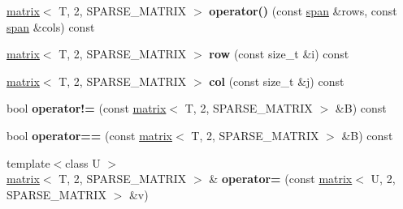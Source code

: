 \begin{DoxyCompactItemize}
\item 
\hypertarget{classkeycpp_1_1matrix_3_01_t_00_012_00_01_s_p_a_r_s_e___m_a_t_r_i_x_01_4_a5cd992aa58c20c8e25921df7f2dbdc53}{\hyperlink{classkeycpp_1_1matrix}{matrix}$<$ T, 2, S\-P\-A\-R\-S\-E\-\_\-\-M\-A\-T\-R\-I\-X $>$ {\bfseries operator()} (const \hyperlink{classkeycpp_1_1span}{span} \&rows, const \hyperlink{classkeycpp_1_1span}{span} \&cols) const }\label{classkeycpp_1_1matrix_3_01_t_00_012_00_01_s_p_a_r_s_e___m_a_t_r_i_x_01_4_a5cd992aa58c20c8e25921df7f2dbdc53}

\item 
\hypertarget{classkeycpp_1_1matrix_3_01_t_00_012_00_01_s_p_a_r_s_e___m_a_t_r_i_x_01_4_a73bb5345dc3cb722ad653bac50979f77}{\hyperlink{classkeycpp_1_1matrix}{matrix}$<$ T, 2, S\-P\-A\-R\-S\-E\-\_\-\-M\-A\-T\-R\-I\-X $>$ {\bfseries row} (const size\-\_\-t \&i) const }\label{classkeycpp_1_1matrix_3_01_t_00_012_00_01_s_p_a_r_s_e___m_a_t_r_i_x_01_4_a73bb5345dc3cb722ad653bac50979f77}

\item 
\hypertarget{classkeycpp_1_1matrix_3_01_t_00_012_00_01_s_p_a_r_s_e___m_a_t_r_i_x_01_4_a41e530bd0c38232974f49562f4c97d6a}{\hyperlink{classkeycpp_1_1matrix}{matrix}$<$ T, 2, S\-P\-A\-R\-S\-E\-\_\-\-M\-A\-T\-R\-I\-X $>$ {\bfseries col} (const size\-\_\-t \&j) const }\label{classkeycpp_1_1matrix_3_01_t_00_012_00_01_s_p_a_r_s_e___m_a_t_r_i_x_01_4_a41e530bd0c38232974f49562f4c97d6a}

\item 
\hypertarget{classkeycpp_1_1matrix_3_01_t_00_012_00_01_s_p_a_r_s_e___m_a_t_r_i_x_01_4_aafd159e412dffd5ebb84620f8a6a7c0a}{bool {\bfseries operator!=} (const \hyperlink{classkeycpp_1_1matrix}{matrix}$<$ T, 2, S\-P\-A\-R\-S\-E\-\_\-\-M\-A\-T\-R\-I\-X $>$ \&B) const }\label{classkeycpp_1_1matrix_3_01_t_00_012_00_01_s_p_a_r_s_e___m_a_t_r_i_x_01_4_aafd159e412dffd5ebb84620f8a6a7c0a}

\item 
\hypertarget{classkeycpp_1_1matrix_3_01_t_00_012_00_01_s_p_a_r_s_e___m_a_t_r_i_x_01_4_a79caa90a213715fc7adde1fe8dbf63d5}{bool {\bfseries operator==} (const \hyperlink{classkeycpp_1_1matrix}{matrix}$<$ T, 2, S\-P\-A\-R\-S\-E\-\_\-\-M\-A\-T\-R\-I\-X $>$ \&B) const }\label{classkeycpp_1_1matrix_3_01_t_00_012_00_01_s_p_a_r_s_e___m_a_t_r_i_x_01_4_a79caa90a213715fc7adde1fe8dbf63d5}

\item 
\hypertarget{classkeycpp_1_1matrix_3_01_t_00_012_00_01_s_p_a_r_s_e___m_a_t_r_i_x_01_4_a0d25ced8f8e02ddd30ca3c1f321162c4}{{\footnotesize template$<$class U $>$ }\\\hyperlink{classkeycpp_1_1matrix}{matrix}$<$ T, 2, S\-P\-A\-R\-S\-E\-\_\-\-M\-A\-T\-R\-I\-X $>$ \& {\bfseries operator=} (const \hyperlink{classkeycpp_1_1matrix}{matrix}$<$ U, 2, S\-P\-A\-R\-S\-E\-\_\-\-M\-A\-T\-R\-I\-X $>$ \&v)}\label{classkeycpp_1_1matrix_3_01_t_00_012_00_01_s_p_a_r_s_e___m_a_t_r_i_x_01_4_a0d25ced8f8e02ddd30ca3c1f321162c4}


\end{DoxyCompactItemize}

